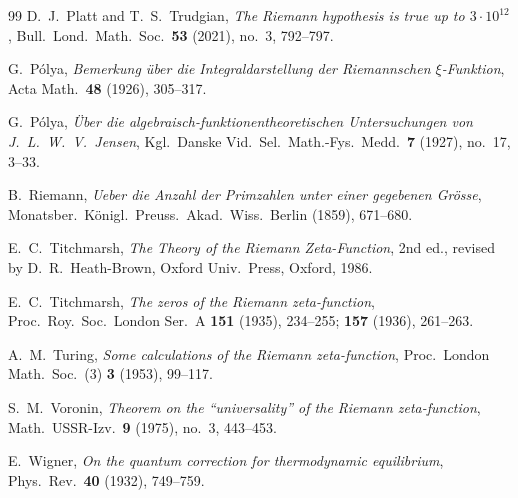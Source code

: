 \documentclass[11pt,reqno]{amsart}
\theoremstyle{definition}
\theoremstyle{remark}
\numberwithin{equation}{section}
\begin{document}
\begin{thebibliography}{99}
D.~J.~Platt and T.~S.~Trudgian,
\emph{The Riemann hypothesis is true up to $3\cdot 10^{12}$},
Bull.\ Lond.\ Math.\ Soc.\ \textbf{53} (2021), no.~3, 792--797.

G.~P\'olya,
\emph{Bemerkung \"uber die Integraldarstellung der Riemannschen $\xi$-Funktion},
Acta Math.\ \textbf{48} (1926), 305--317.

G.~P\'olya,
\emph{\"Uber die algebraisch-funktionentheoretischen Untersuchungen von J.~L.~W.~V.~Jensen},
Kgl.\ Danske Vid.\ Sel.\ Math.-Fys.\ Medd.\ \textbf{7} (1927), no.~17, 3--33.

B.~Riemann,
\emph{Ueber die Anzahl der Primzahlen unter einer gegebenen Gr\"osse},
Monatsber.\ K\"onigl.\ Preuss.\ Akad.\ Wiss.\ Berlin (1859), 671--680.

E.~C.~Titchmarsh,
\emph{The Theory of the Riemann Zeta-Function},
2nd ed., revised by D.~R.~Heath-Brown, Oxford Univ.\ Press, Oxford, 1986.

E.~C.~Titchmarsh,
\emph{The zeros of the Riemann zeta-function},
Proc.\ Roy.\ Soc.\ London Ser.~A \textbf{151} (1935), 234--255; \textbf{157} (1936), 261--263.

A.~M.~Turing,
\emph{Some calculations of the Riemann zeta-function},
Proc.\ London Math.\ Soc.\ (3) \textbf{3} (1953), 99--117.

S.~M.~Voronin,
\emph{Theorem on the ``universality'' of the Riemann zeta-function},
Math.\ USSR-Izv.\ \textbf{9} (1975), no.~3, 443--453.

E.~Wigner,
\emph{On the quantum correction for thermodynamic equilibrium},
Phys.\ Rev.\ \textbf{40} (1932), 749--759.

\end{thebibliography}
\end{document}

